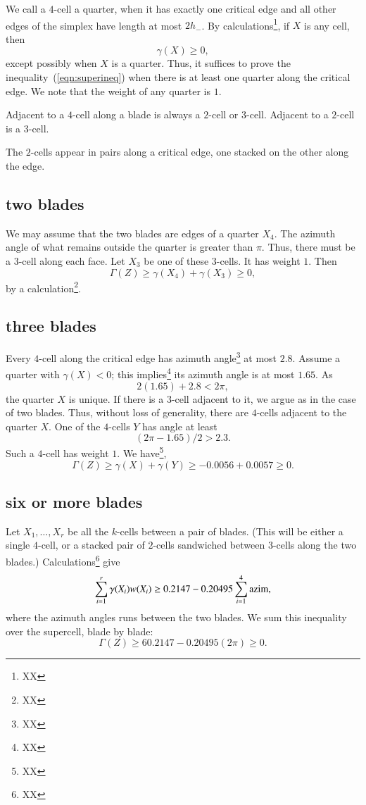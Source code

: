 We call a $4$-cell a quarter, when it has exactly one
critical edge and all other edges of the simplex have length
at most $2 h_-$.
By calculations\footnote{XX}, if $X$ is any cell, then
$$
 \gamma(X) \ge 0,
$$ 
except possibly when $X$ is a quarter.  Thus, it
suffices to prove the inequality~(\ref{eqn:superineq})
when there is at least one quarter along the critical
edge.  We note that the weight of any quarter is $1$.

Adjacent to a $4$-cell along a blade is always a $2$-cell or $3$-cell.
Adjacent to a $2$-cell is a $3$-cell.

The $2$-cells appear in pairs along a critical edge,
one stacked on the other along the edge.

\subsection{two blades}

We may assume that the two blades are edges of a quarter
$X_4$. 
The azimuth angle of what remains outside the quarter
is greater than $\pi$.  Thus, there must be a $3$-cell
along each face.  Let $X_3$ be one of these $3$-cells.
It has weight $1$.
Then $$\Gamma(Z)\ge \gamma(X_4)+\gamma(X_3)\ge 0,$$
by a calculation\footnote{XX}.

\subsection{three blades}

Every $4$-cell along the critical edge has azimuth
angle\footnote{XX} at most $2.8$.  Assume a quarter with $\gamma(X) <0$;
this implies\footnote{XX} 
its azimuth angle is at most $1.65$.
As
$$
2 (1.65) + 2.8 < 2 \pi,
$$
the quarter $X$ is unique.  If there is a $3$-cell adjacent
to it, we argue as in the case of two blades.  Thus, without loss of generality, there are $4$-cells adjacent to the quarter $X$.  One of the $4$-cells $Y$ has angle at least
$$
(2\pi - 1.65)/2 > 2.3.
$$
Such a $4$-cell has weight $1$.
We have\footnote{XX},
$$
\Gamma(Z)\ge \gamma(X) + \gamma(Y) \ge -0.0056 + 0.0057 \ge0.
$$

\subsection{six or more blades}

Let $X_1,\ldots,X_r$ be all the $k$-cells between a pair of
blades.  (This will be either a single $4$-cell, or a stacked pair of $2$-cells sandwiched between $3$-cells along
the two blades.)  Calculations\footnote{XX} give
$$\sum_{i=1}^r \gamma(X_i) w(X_i) \ge 0.2147 - 0.20495\sum_{i=1}^4 {\operatorname{azim}},$$
where the azimuth angles runs between the two blades.
We sum this inequality over the supercell, blade by blade:
$$
\Gamma(Z) \ge 6 0.2147 - 0.20495 (2\pi) \ge 0.
$$


